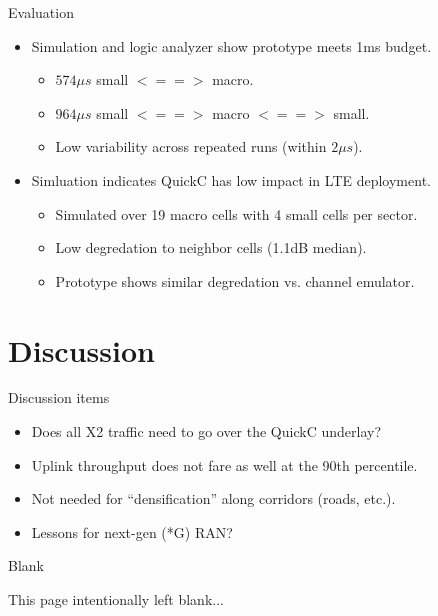 \documentclass[xcolor=pdftex,dvipsnames,table]{beamer}
\begin{document}
\begin{frame}{Evaluation}
  \begin{itemize}
  \item Simulation and logic analyzer show prototype meets 1ms budget.
    \begin{itemize}
    \item $574{\mu}s$ small $<==>$ macro.
    \item $964{\mu}s$ small $<==>$ macro $<==>$ small.
    \item Low variability across repeated runs (within $2{\mu}s$).
    \end{itemize}
  \item Simluation indicates QuickC has low impact in LTE deployment.
    \begin{itemize}
    \item Simulated over 19 macro cells with 4 small cells per sector.
    \item Low degredation to neighbor cells (1.1dB median).
    \item Prototype shows similar degredation vs. channel emulator.
    \end{itemize}
  \end{itemize}
\end{frame}

\section{Discussion}

\begin{frame}{Discussion items}
  \begin{itemize}
  \item Does all X2 traffic need to go over the QuickC underlay?
  \item Uplink throughput does not fare as well at the 90th percentile.
  \item Not needed for ``densification'' along corridors (roads, etc.).
  \item Lessons for next-gen (*G) RAN?
  \end{itemize}
\end{frame}

\begin{frame}{Blank}
  \large{\centerline{This page intentionally left blank...}}
\end{frame}
\end{document}
